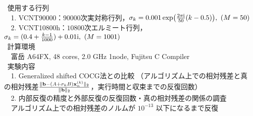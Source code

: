 

\textcolor{structure.fg}{\textbullet} \ 使用する行列\\
	　1. VCNT90000：$90000$次実対称行列，$\sigma_k = 0.001 \exp(\frac{2 \pi \i}{50}(k-0.5)),\ (M=50)$\\
	　2. VCNT10800h：$10800$次エルミート行列，$\sigma_k =(0.4+\frac{k-1}{1000}) + 0.01\i,\ (M=1001)$\\
\textcolor{structure.fg}{\textbullet} \ 計算環境\\
	　富岳 A64FX, 48 cores, 2.0 GHz 1node, Fujitsu C Compiler\\
\textcolor{structure.fg}{\textbullet} \ 実験内容\\
	　1. Generalized shifted COCG法との比較
	（アルゴリズム上での相対残差と真の相対残差$\frac{\|\vb{b}-(A+\sigma_{k}B)\vb{x}_{n}^{(k)}\|_2}{\|\vb{b}\|_2}$，実行時間と収束までの反復回数）\\
	　2. 内部反復の精度と外部反復の反復回数・真の相対残差の関係の調査\\
	　アルゴリズム上での相対残差のノルムが $10^{-13}$ 以下になるまで反復

%
%


\begin{comment}

\begin{itemize}
	\item 使用する行列\\
		1. VCNT90000：$90000$次実対称行列\\
		2. VCNT10800h：$10800$次エルミート行列
	\item 計算環境\\
		富岳 A64FX, 48 cores, 2.0 GHz 1node, Fujitsu C Compiler
	\item 実験内容\\
		1. Generalized shifted COCG法との比較（相対残差$\frac{\|\vb{b}-(A+\sigma_{k}B)\vb{x}_{n}^{(k)}\|_2}{\|\vb{b}\|_2}$，実行時間）\\
		2. 内部反復の精度と外部反復の反復回数・真の相対残差の関係の調査
\end{itemize}

\end{comment}

